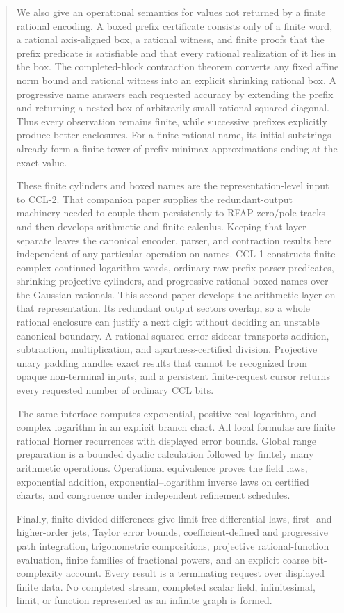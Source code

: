 \documentclass[10pt]{article}
\theoremstyle{definition}
\theoremstyle{remark}
\begin{document}
\begin{abstract}
We also give an operational semantics for values not returned by a finite rational encoding.  A boxed prefix certificate consists only of a finite word, a rational axis-aligned box, a rational witness, and finite proofs that the prefix predicate is satisfiable and that every rational realization of it lies in the box.  The completed-block contraction theorem converts any fixed affine norm bound and rational witness into an explicit shrinking rational box.  A progressive name answers each requested accuracy by extending the prefix and returning a nested box of arbitrarily small rational squared diagonal.  Thus every observation remains finite, while successive prefixes explicitly produce better enclosures.  For a finite rational name, its initial substrings already form a finite tower of prefix-minimax approximations ending at the exact value.

These finite cylinders and boxed names are the representation-level input to
CCL-2.  That companion paper supplies the redundant-output machinery needed
to couple them persistently to RFAP zero/pole tracks and then develops
arithmetic and finite calculus.  Keeping that layer separate leaves the
canonical encoder, parser, and contraction results here independent of any
particular operation on names.
\else
CCL-1 constructs finite complex continued-logarithm words, ordinary
raw-prefix parser predicates, shrinking projective cylinders, and progressive
rational boxed names over the Gaussian rationals.  This second paper develops
the arithmetic layer on that representation.  Its redundant output sectors
overlap, so a whole rational enclosure can justify a next digit without
deciding an unstable canonical boundary.  A rational squared-error sidecar
transports addition, subtraction, multiplication, and apartness-certified
division.  Projective unary padding handles exact results that cannot be
recognized from opaque non-terminal inputs, and a persistent finite-request
cursor returns every requested number of ordinary CCL bits.

The same interface computes exponential, positive-real logarithm, and complex
logarithm in an explicit branch chart.  All local formulae are finite rational
Horner recurrences with displayed error bounds.  Global range preparation is
a bounded dyadic calculation followed by finitely many arithmetic operations.
Operational equivalence proves the field laws, exponential addition,
exponential--logarithm inverse laws on certified charts, and congruence under
independent refinement schedules.

Finally, finite divided differences give limit-free differential laws,
first- and higher-order jets, Taylor error bounds, coefficient-defined and
progressive path integration, trigonometric compositions, projective
rational-function evaluation, finite families of fractional powers, and an
explicit coarse bit-complexity account.  Every result is a terminating
request over displayed finite data.  No completed stream, completed scalar
field, infinitesimal, limit, or function represented as an infinite graph is
formed.
\fi
\end{abstract}
\end{document}
